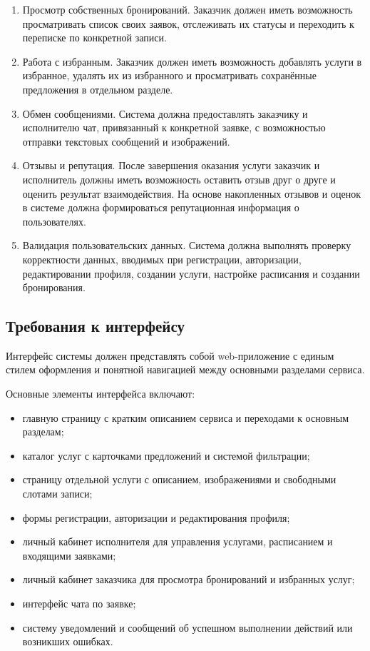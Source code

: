 \begin{enumerate}
	\item Просмотр собственных бронирований.  
	Заказчик должен иметь возможность просматривать список своих заявок, отслеживать их статусы и переходить к переписке по конкретной записи.
	
	\item Работа с избранным.  
	Заказчик должен иметь возможность добавлять услуги в избранное, удалять их из избранного и просматривать сохранённые предложения в отдельном разделе.
	
	\item Обмен сообщениями.  
	Система должна предоставлять заказчику и исполнителю чат, привязанный к конкретной заявке, с возможностью отправки текстовых сообщений и изображений.
	
	\item Отзывы и репутация.  
	После завершения оказания услуги заказчик и исполнитель должны иметь возможность оставить отзыв друг о друге и оценить результат взаимодействия. На основе накопленных отзывов и оценок в системе должна формироваться репутационная информация о пользователях.
	
	\item Валидация пользовательских данных.  
	Система должна выполнять проверку корректности данных, вводимых при регистрации, авторизации, редактировании профиля, создании услуги, настройке расписания и создании бронирования.
\end{enumerate}

\subsection{Требования к интерфейсу}

Интерфейс системы должен представлять собой web-приложение с единым стилем оформления и понятной навигацией между основными разделами сервиса.

Основные элементы интерфейса включают:
\begin{itemize}
	\item главную страницу с кратким описанием сервиса и переходами к основным разделам;
	\item каталог услуг с карточками предложений и системой фильтрации;
	\item страницу отдельной услуги с описанием, изображениями и свободными слотами записи;
	\item формы регистрации, авторизации и редактирования профиля;
	\item личный кабинет исполнителя для управления услугами, расписанием и входящими заявками;
	\item личный кабинет заказчика для просмотра бронирований и избранных услуг;
	\item интерфейс чата по заявке;
	\item систему уведомлений и сообщений об успешном выполнении действий или возникших ошибках.
\end{itemize}

